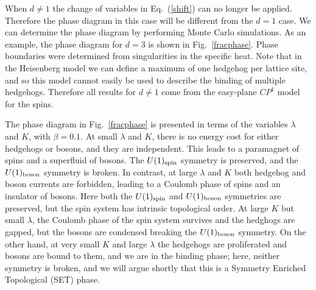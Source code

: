 \documentclass[prb,twocolumn]{revtex4-1}
\begin{document}
When $d\neq1$ the change of variables in Eq.~(\ref{shift}) can no longer be applied. Therefore the phase diagram in this case will be different from the $d=1$ case. We can determine the phase diagram by performing Monte Carlo simulations. As an example, the phase diagram for $d=3$ is shown in Fig.~\ref{fracphase}. Phase boundaries were determined from singularities in the specific heat. Note that in the Heisenberg model we can define a maximum of one hedgehog per lattice site, and so this model cannot easily be used to describe the binding of  multiple hedgehogs. Therefore all results for $d \neq 1$ come from the easy-plane $CP^1$ model for the spins. 

The phase diagram in Fig.~\ref{fracphase} is presented in terms of the variables $\lambda$ and $K$, with $\beta=0.1$. 
At small $\lambda$ and $K$, there is no energy cost for either hedgehogs or bosons, and they are independent. This leads to a paramagnet of spins and a superfluid of bosons. The $U(1)_{\rm spin}$ symmetry is preserved, and the $U(1)_{\rm boson}$ symmetry is broken. In contrast, at large $\lambda$ and $K$ both hedgehog and boson currents are forbidden, leading to a Coulomb phase of spins and an insulator of bosons. Here both the $U(1)_{\rm spin}$ and $U(1)_{\rm boson}$ symmetries are preserved, but the spin system has intrinsic topological order. 
At large $K$ but small $\lambda$, the Coulomb phase of the spin system survives and the hedghogs are gapped, but the bosons are condensed breaking the $U(1)_{\rm boson}$ symmetry.
On the other hand, at very small $K$ and large $\lambda$ the hedgehogs are proliferated and bosons are bound to them, and we are in the binding phase; here, neither symmetry is broken, and we will argue shortly that this is a Symmetry Enriched Topological (SET) phase. 
\end{document}
